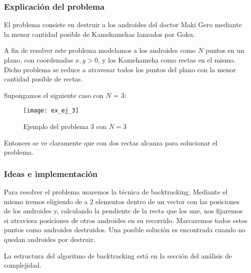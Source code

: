 \subsubsection{Explicación del problema}
El problema consiste en destruir a los androides del doctor Maki Gero mediante la menor cantidad posible de Kamehamehas lanzados por Goku.

A fin de resolver este problema modelamos a los androides como $N$ puntos en un plano, con coordenadas $x, y > 0$, y los Kamehameha como rectas en el mismo. Dicho problema se reduce a atravesar todos los puntos del plano con la menor cantidad posible de rectas.

Supongamos el siguiente caso con $N$ = 3:

\begin{figure}[h!]
\begin{center}
\texttt{[image: ex\_ej\_3]}
\caption{Ejemplo del problema 3 con $N = 3$}
\end{center}
\end{figure}

Entonces se ve claramente que con dos rectas alcanza para solucionar el problema.

\subsubsection{Ideas e implementación}

Para resolver el problema usaremos la técnica de backtracking. Mediante el mismo iremos eligiendo de a 2 elementos dentro de un vector con las posiciones de los androides y, calculando la pendiente de la recta que los une, nos fijaremos si atraviesa posiciones de otros androides en su recorrido. Marcaremos todos estos puntos como androides destruidos.
Una posible solución es encontrada cuando no quedan androides por destruir.

La estructura del algoritmo de backtracking está en la sección del análisis de complejidad.

%



